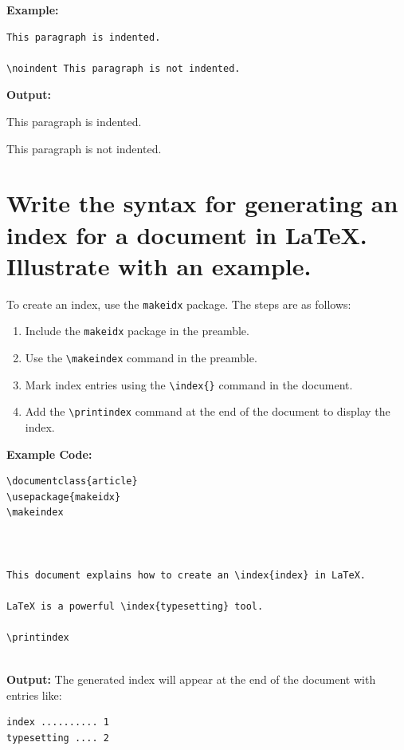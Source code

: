 
\textbf{Example:}
\begin{verbatim}
This paragraph is indented.

\noindent This paragraph is not indented.
\end{verbatim}

\textbf{Output:}

This paragraph is indented.  

\noindent This paragraph is not indented.

\section{Write the syntax for generating an index for a document in LaTeX. Illustrate with an example.}
To create an index, use the \texttt{makeidx} package. The steps are as follows:
\begin{enumerate}
    \item Include the \texttt{makeidx} package in the preamble.
    \item Use the \texttt{\textbackslash makeindex} command in the preamble.
    \item Mark index entries using the \texttt{\textbackslash index\{\}} command in the document.
    \item Add the \texttt{\textbackslash printindex} command at the end of the document to display the index.
\end{enumerate}


\textbf{Example Code:}
\begin{verbatim}
\documentclass{article}
\usepackage{makeidx}
\makeindex



This document explains how to create an \index{index} in LaTeX.

LaTeX is a powerful \index{typesetting} tool.

\printindex


\end{verbatim}

\textbf{Output:}
The generated index will appear at the end of the document with entries like:
\begin{verbatim}
index .......... 1
typesetting .... 2
\end{verbatim}


